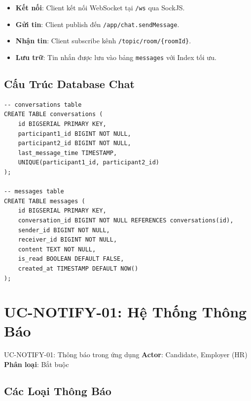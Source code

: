 \documentclass[12pt, a4paper]{report}
\begin{document}
\begin{itemize}
    \item \textbf{Kết nối}: Client kết nối WebSocket tại \texttt{/ws} qua SockJS.
    \item \textbf{Gửi tin}: Client publish đến \texttt{/app/chat.sendMessage}.
    \item \textbf{Nhận tin}: Client subscribe kênh \texttt{/topic/room/\{roomId\}}.
    \item \textbf{Lưu trữ}: Tin nhắn được lưu vào bảng \texttt{messages} với Index tối ưu.
\end{itemize}

\subsection{Cấu Trúc Database Chat}

\begin{lstlisting}[style=sqlstyle]
-- conversations table
CREATE TABLE conversations (
    id BIGSERIAL PRIMARY KEY,
    participant1_id BIGINT NOT NULL,
    participant2_id BIGINT NOT NULL,
    last_message_time TIMESTAMP,
    UNIQUE(participant1_id, participant2_id)
);

-- messages table
CREATE TABLE messages (
    id BIGSERIAL PRIMARY KEY,
    conversation_id BIGINT NOT NULL REFERENCES conversations(id),
    sender_id BIGINT NOT NULL,
    receiver_id BIGINT NOT NULL,
    content TEXT NOT NULL,
    is_read BOOLEAN DEFAULT FALSE,
    created_at TIMESTAMP DEFAULT NOW()
);
\end{lstlisting}

\section{UC-NOTIFY-01: Hệ Thống Thông Báo}

\begin{requirementbox}{UC-NOTIFY-01: Thông báo trong ứng dụng}
\textbf{Actor}: Candidate, Employer (HR) \\
\textbf{Phân loại}: Bắt buộc
\end{requirementbox}

\subsection{Các Loại Thông Báo}
\end{document}
